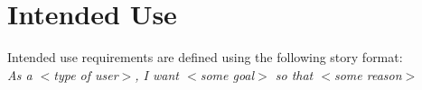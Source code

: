\clearpage
\section{Intended Use}
\label{sec:iur}

Intended use requirements are defined using the following story format: \\
\hspace*{1.5cm}\emph{As a $<$type of user$>$, I want $<$some goal$>$ so that
$<$some reason$>$}


